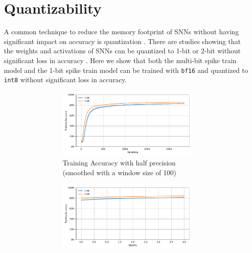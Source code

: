 \section{Quantizability}
\label{sec:quantizability}
    A common technique to reduce the memory footprint of SNNs without having significant impact on accuracy is quantization \cite{9534087}. There are studies showing that the weights and activations of SNNs can be quantized to 1-bit or 2-bit without significant loss in accuracy \cite{10.1145/3664647.3681186}. Here we show that both the multi-bit spike train model and the 1-bit spike train model can be trained with \verb|bf16| and quantized to \verb|int8| without significant loss in accuracy.
    \begin{figure}[!htpb]
        \centering
        \begin{subfigure}[H]{0.89\textwidth}
            \centering
            \begin{subfigure}[H]{\textwidth}
                \centering
                \includegraphics[width=\textwidth]{../quantized/FashionMNIST/plots/fashionmnist_train_acc.pdf}
                \caption{Training Accuracy with half precision (smoothed with a window size of 100)}
            \end{subfigure}
            \hfill
            \begin{subfigure}[H]{\textwidth}
                \centering
                \includegraphics[width=\textwidth]{../bf16/FashionMNIST/plots/fashionmnist_test_acc.pdf}

\end{subfigure}
\end{subfigure}
\end{figure}
